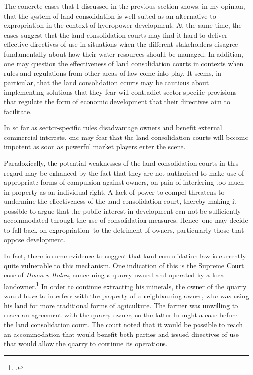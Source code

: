 The concrete cases that I discussed in the previous section shows, in my opinion, that the system of land consolidation is well suited as an alternative to expropriation in the context of hydropower development. At the same time, the cases suggest that the land consolidation courts may find it hard to deliver effective directives of use in situations when the different stakeholders disagree fundamentally about how their water resources should be managed. In addition, one may question the effectiveness of land consolidation courts in contexts when rules and regulations from other areas of law come into play. It seems, in particular, that the land consolidation courts may be cautious about implementing solutions that they fear will contradict sector-specific provisions that regulate the form of economic development that their directives aim to facilitate.

In so far as sector-specific rules disadvantage owners and benefit external commercial interests, one may fear that the land consolidation courts will become impotent as soon as powerful market players enter the scene.

Paradoxically, the potential weaknesses of the land consolidation courts in this regard may be enhanced by the fact that they are not authorised to make use of appropriate forms of compulsion against owners, on pain of interfering too much in property as an individual right. A lack of power to compel threatens to undermine the effectiveness of the land consolidation court, thereby making it possible to argue that the public interest in development can not be sufficiently accommodated through the use of consolidation measures. Hence, one may decide to fall back on expropriation, to the detriment of owners, particularly those that oppose development.

In fact, there is some evidence to suggest that land consolidation law is currently quite vulnerable to this mechanism. One indication of this is the Supreme Court case of {\it Holen v Holen}, concerning a quarry owned and operated by a local landowner.\footcite{holen95} In order to continue extracting his minerals, the owner of the quarry would have to interfere with the property of a neighbouring owner, who was using his land for more traditional forms of agriculture. The farmer was unwilling to reach an agreement with the quarry owner, so the latter brought a case before the land consolidation court. The court noted that it would be possible to reach an accommodation that would benefit both parties and issued directives of use that would allow the quarry to continue its operations.

